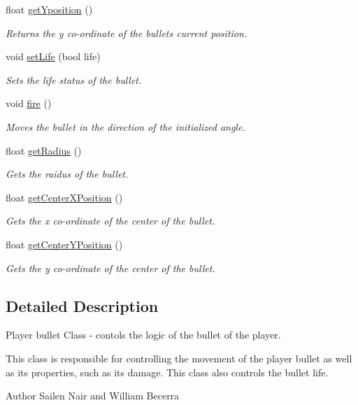 \begin{DoxyCompactItemize}
float \hyperlink{class_player_bullet_a240cab35d5d909366986b8661ee65d3c}{get\+Yposition} ()
\begin{DoxyCompactList}\small\item\em Returns the y co-\/ordinate of the bullets current position. \end{DoxyCompactList}\item 
void \hyperlink{class_player_bullet_af713549c4bb9a2400a7929564f5b81ff}{set\+Life} (bool life)
\begin{DoxyCompactList}\small\item\em Sets the life status of the bullet. \end{DoxyCompactList}\item 
void \hyperlink{class_player_bullet_a4ef09e533d8d3016d7e08d9efae238ff}{fire} ()
\begin{DoxyCompactList}\small\item\em Moves the bullet in the direction of the initialized angle. \end{DoxyCompactList}\item 
float \hyperlink{class_player_bullet_a1ff56e38b1447500d2887b6fe1eeb674}{get\+Radius} ()
\begin{DoxyCompactList}\small\item\em Gets the raidus of the bullet. \end{DoxyCompactList}\item 
float \hyperlink{class_player_bullet_a73c27dca47ea3fdcecd82ce4b2089c4a}{get\+Center\+X\+Position} ()
\begin{DoxyCompactList}\small\item\em Gets the x co-\/ordinate of the center of the bullet. \end{DoxyCompactList}\item 
float \hyperlink{class_player_bullet_a7ad2bc922595b9a11373fd42666926ef}{get\+Center\+Y\+Position} ()
\begin{DoxyCompactList}\small\item\em Gets the y co-\/ordinate of the center of the bullet. \end{DoxyCompactList}\end{DoxyCompactItemize}


\subsection{Detailed Description}
Player bullet Class -\/ contols the logic of the bullet of the player. 

This class is responsible for controlling the movement of the player bullet as well as its properties, such as its damage. This class also controls the bullet life. \begin{DoxyAuthor}{Author}
Sailen Nair and William Becerra 
\end{DoxyAuthor}


